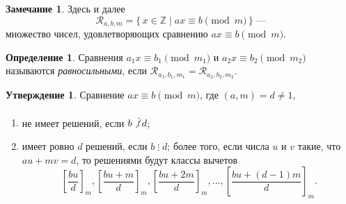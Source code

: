 \documentclass[14pt, a4paper]{extarticle}
\theoremstyle{definition}
\newtheorem*{definition}{Определение}
\newtheorem*{remark}{Замечание}
\newtheorem{statement}{Утверждение}
\newcommand{\divisible}{\mathop{\vdots}}
\begin{document}
	\begin{remark}
		Здесь и далее $$\mathcal{R}_{a,b,m}=\{\,x\in\mathbb{Z}\mid ax\equiv b\pmod{m}\,\}\text{ ---}$$ множество чисел, удовлетворяющих сравнению $ax\equiv b\pmod{m}$.
	\end{remark}

	\begin{definition}
		Сравнения $a_1x\equiv b_1\pmod{m_1}$ и $a_2x\equiv b_2\pmod{m_2}$ называются \emph{равносильными}, если $\mathcal{R}_{a_1,b_1,m_1}=\mathcal{R}_{a_2,b_2,m_2}$.
	\end{definition}

	\begin{statement}
		Сравнение $ax\equiv b\pmod{m}$, где $(a,m)=d\neq1$,
		\begin{enumerate}[topsep=0pt,itemsep=-1ex,partopsep=1ex,parsep=1ex]
			\item не имеет решений, если $b\not\divisible d$;
			\item имеет ровно $d$ решений, если $b\divisible d$; более того, если числа $u$ и $v$ такие, что $au+mv=d$, то решениями будут классы вычетов $$\left[\frac{bu}{d}\right]_m, \left[\frac{bu+m}{d}\right]_m, \left[\frac{bu+2m}{d}\right]_m, \dots, \left[\frac{bu+(d-1)m}{d}\right]_m.$$
		\end{enumerate}
	\end{statement}
\end{document}

